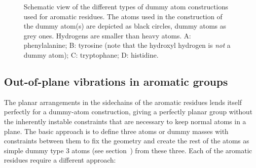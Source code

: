 \begin{figure}
\centerline{}
\caption[Schematic view of the different types of dummy atom
constructions used for aromatic residues.]{Schematic view of the
different types of dummy atom constructions used for aromatic
residues. The atoms used in the construction of the dummy atom(s) are
depicted as black circles, dummy atoms as grey ones. Hydrogens are
smaller than heavy atoms. {\sf A}: phenylalanine; {\sf B}: tyrosine
(note that the hydroxyl hydrogen is {\em not} a dummy atom); {\sf C}:
tryptophane; {\sf D}: histidine.}
\label{fig:dumaro}
\end{figure}

\subsection{Out-of-plane vibrations in aromatic groups}
\label{sec:dummyaro}
The planar arrangements in the sidechains of the aromatic residues
lends itself perfectly for a dummy-atom construction, giving a
perfectly planar group without the inherently instable constraints
that are necessary to keep normal atoms in a plane. The basic approach
is to define three atoms or dummy masses with constraints between them
to fix the geometry and create the rest of the atoms as simple dummy
type 3 atoms (see section~) from these three. Each of
the aromatic residues require a different approach:

